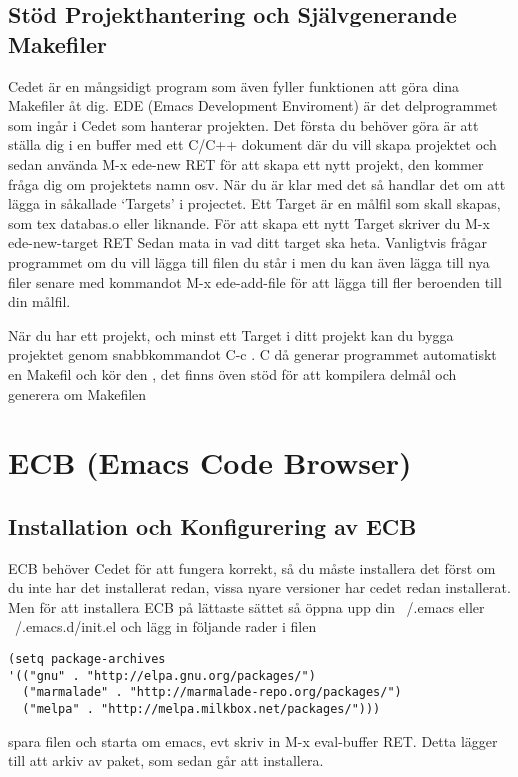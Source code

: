 \documentclass[12pt]{article} %
\begin{document}
\subsection{Stöd Projekthantering och Självgenerande Makefiler}
Cedet är en mångsidigt program som även fyller funktionen att göra dina Makefiler åt dig. EDE (Emacs Development Enviroment) är det delprogrammet som ingår i Cedet som hanterar projekten. Det första du behöver göra är att ställa dig i en buffer med ett C/C++ dokument där du vill skapa projektet och sedan använda M-x ede-new RET för att skapa ett nytt projekt, den kommer fråga dig om projektets namn osv. När du är klar med det så handlar det om att lägga in såkallade `Targets' i projectet. Ett Target är en målfil som skall skapas, som tex databas.o eller liknande. För att skapa ett nytt Target skriver du M-x ede-new-target RET Sedan mata in vad ditt target ska heta. Vanligtvis frågar programmet om du vill lägga till filen du står i men du kan även lägga till nya filer senare med kommandot M-x ede-add-file för att lägga till fler beroenden till din målfil.

När du har ett projekt, och minst ett Target i ditt projekt kan du bygga projektet genom snabbkommandot C-c . C då generar programmet automatiskt en Makefil och kör den , det finns öven stöd för att kompilera delmål och generera om Makefilen  

\newpage
\section{ECB (Emacs Code Browser)}

\subsection{Installation och Konfigurering av ECB}
ECB behöver Cedet för att fungera korrekt, så du måste installera det först om du inte har det installerat redan, vissa nyare versioner har cedet redan installerat. Men för att installera ECB på lättaste sättet så öppna upp din ~/.emacs eller ~/.emacs.d/init.el och lägg in följande rader i filen
\begin{lstlisting}
(setq package-archives 
'(("gnu" . "http://elpa.gnu.org/packages/")
  ("marmalade" . "http://marmalade-repo.org/packages/")
  ("melpa" . "http://melpa.milkbox.net/packages/")))
\end{lstlisting}
spara filen och starta om emacs, evt skriv in M-x eval-buffer RET. Detta lägger till att arkiv av paket, som sedan går att installera.
\end{document}
